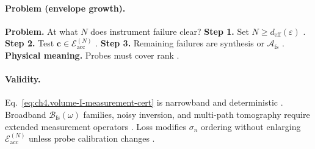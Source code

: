 \paragraph{Problem (envelope growth).}
\textbf{Problem.} At what \(N\) does instrument failure clear?
\textbf{Step 1.} Set \(N\ge d_{\mathrm{eff}}(\varepsilon)\) \cite{harrington2001,hansen1988}.
\textbf{Step 2.} Test \(\mathbf{c}\in\mathcal{E}_{\mathrm{acc}}^{(N)}\) \cite{devaney2004,stratton1941}.
\textbf{Step 3.} Remaining failures are synthesis or \(\mathcal{A}_{\mathrm{fs}}\) \cite{jackson1999,collin2001}.
\textbf{Physical meaning.} Probes must cover rank \cite{harrington2001,stratton1941}.

\paragraph{Validity.}
Eq.~\eqref{eq:ch4.volume-I-measurement-cert} is narrowband and deterministic \cite{stratton1941}. Broadband \(\mathcal{B}_{\mathrm{fs}}(\omega)\) families,
noisy inversion, and multi-path tomography require extended measurement operators \cite{harrington2001,devaney2004,jackson1999}. Loss modifies \(\sigma_{n}\)
ordering without enlarging \(\mathcal{E}_{\mathrm{acc}}^{(N)}\) unless probe calibration changes \cite{hansen1988,collin2001}.
